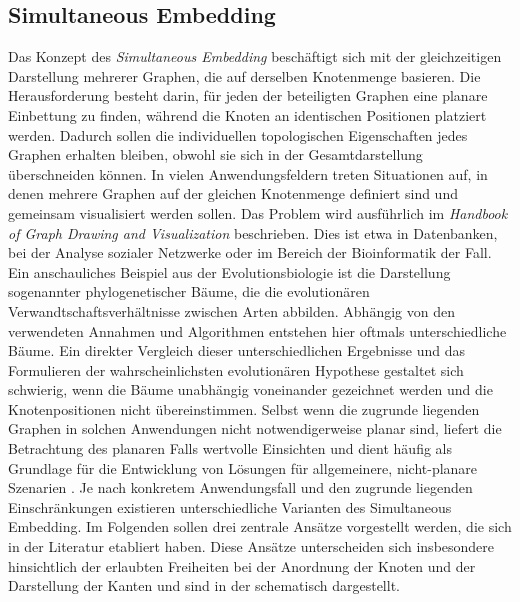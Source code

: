 \documentclass[bachelor, german]{algothesis}
\begin{document}
\subsection{Simultaneous Embedding}
Das Konzept des \emph{Simultaneous Embedding} beschäftigt sich mit der gleichzeitigen Darstellung mehrerer Graphen, die auf derselben Knotenmenge basieren. Die Herausforderung besteht darin, für jeden der beteiligten Graphen eine planare Einbettung zu finden, während die Knoten an identischen Positionen platziert werden. Dadurch sollen die individuellen topologischen Eigenschaften jedes Graphen erhalten bleiben, obwohl sie sich in der Gesamtdarstellung überschneiden können.\newline
In vielen Anwendungsfeldern treten Situationen auf, in denen mehrere Graphen auf der gleichen Knotenmenge definiert sind und gemeinsam visualisiert werden sollen. Das Problem wird ausführlich im \textit{Handbook of Graph Drawing and Visualization}\cite{Handbook} beschrieben. Dies ist etwa in Datenbanken, bei der Analyse sozialer Netzwerke oder im Bereich der Bioinformatik der Fall. \newline
Ein anschauliches Beispiel aus der Evolutionsbiologie ist die Darstellung sogenannter phylogenetischer Bäume, die die evolutionären Verwandtschaftsverhältnisse zwischen Arten abbilden. Abhängig von den verwendeten Annahmen und Algorithmen entstehen hier oftmals unterschiedliche Bäume. Ein direkter Vergleich dieser unterschiedlichen Ergebnisse und das Formulieren der wahrscheinlichsten evolutionären Hypothese gestaltet sich schwierig, wenn die Bäume unabhängig voneinander gezeichnet werden und die Knotenpositionen nicht übereinstimmen. \newline
Selbst wenn die zugrunde liegenden Graphen in solchen Anwendungen nicht notwendigerweise planar sind, liefert die Betrachtung des planaren Falls wertvolle Einsichten und dient häufig als Grundlage für die Entwicklung von Lösungen für allgemeinere, nicht-planare Szenarien \cite{Handbook}.\newline
Je nach konkretem Anwendungsfall und den zugrunde liegenden Einschränkungen existieren unterschiedliche Varianten des Simultaneous Embedding. Im Folgenden sollen drei zentrale Ansätze vorgestellt werden, die sich in der Literatur etabliert haben. Diese Ansätze unterscheiden sich insbesondere hinsichtlich der erlaubten Freiheiten bei der Anordnung der Knoten und der Darstellung der Kanten und sind in der  schematisch dargestellt.
\end{document}
